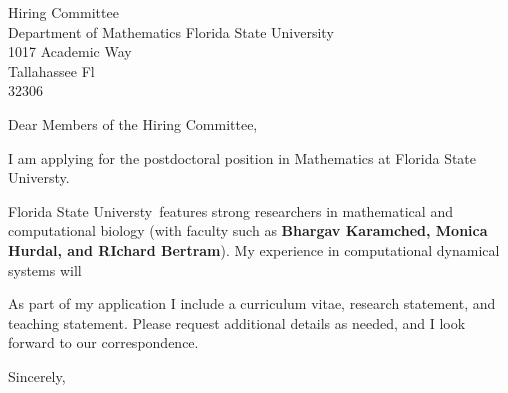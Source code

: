 \documentclass[11pt,a4paper]{letter}
\begin{document}
\def\School{Florida State Universty}
\begin{letter}
{Hiring Committee\\
Department of Mathematics Florida State University\\
1017 Academic Way\\
Tallahassee Fl\\
32306}


\opening{Dear Members of the Hiring Committee,}

I am applying for the postdoctoral position in Mathematics at \School. 



\School~features strong researchers in mathematical and computational biology (with faculty such as \textbf{Bhargav Karamched, Monica Hurdal, and RIchard Bertram}). My experience in computational dynamical systems will 



As part of my application I include a curriculum vitae, research statement, and teaching statement. Please request additional details as needed, and I look forward to our correspondence.

\closing{Sincerely,}
\end{letter}
\end{document}
